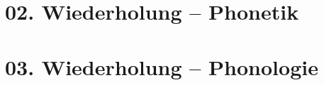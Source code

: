 \documentclass[handout,aspectratio=1610,dvipsnames]{beamer}
\begin{document}
  \section{02. Wiederholung -- Phonetik}
  \let\woopsi\section\let\section\subsection\let\subsection\subsubsection
  
  \let\subsection\section\let\section\woopsi
  
  \section{03. Wiederholung -- Phonologie}
  \let\woopsi\section\let\section\subsection\let\subsection\subsubsection
  
  \let\subsection\section\let\section\woopsi
  
\end{document}
